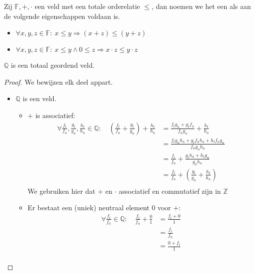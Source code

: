 \documentclass[main.tex]{subfiles}
\begin{document}
\begin{de}
  \label{de:totaal-geordend-veld}
  Zij $\mathbb{F},+,\cdot$ een veld met een totale orderelatie $\le$, dan noemen we het een  als aan de volgende eigenschappen voldaan is.
  \begin{itemize}
  \item $\forall x,y,z \in \mathbb{F}:\ x \le y \Rightarrow (x+z) \le (y+z)$
  \item $\forall x,y,z \in \mathbb{F}:\ x \le y \wedge 0 \le z \Rightarrow x\cdot z \le y\cdot z$
  \end{itemize}
\end{de}

\begin{pr}
  $\mathbb{Q}$ is een totaal geordend veld.

  \begin{proof}
    We bewijzen elk deel appart.
    \begin{itemize}
    \item $\mathbb{Q}$ is een veld.
      \begin{itemize}
      \item $+$ is associatief:
        \[ 
        \begin{array}{rrl}
          \forall \frac{f_{t}}{f_{n}},\frac{g_{t}}{g_{n}},\frac{h_{t}}{h_{n}} \in \mathbb{Q}:\
          &\left(\frac{f_{t}}{f_{n}} + \frac{g_{t}}{g_{n}}\right) + \frac{h_{t}}{h_{n}}
          &= \frac{f_{t}g_{n} + g_{t}f_{n}}{f_{n}g_{n}} + \frac{h_{t}}{h_{n}}\\
          &&= \frac{f_{t}g_{n}h_{n} + g_{t}f_{n}h_{n} + h_{t}f_{n}g_{n}}{f_{n}g_{n}h_{n}}\\
          &&=  \frac{f_{t}}{f_{n}} + \frac{g_{t}h_{n} + h_{t}g_{n}}{g_{n}h_{n}}\\
          &&= \frac{f_{t}}{f_{n}} + \left(\frac{g_{t}}{g_{n}} + \frac{h_{t}}{h_{n}}\right)\\
        \end{array}
        \]
        We gebruiken hier dat $+$ en $\cdot$ associatief en commutatief zijn in $\mathbb{Z}$
      \item Er bestaat een (uniek) neutraal element $0$ voor $+$:
        \[
        \begin{array}{rrl}
          \forall \frac{f_{t}}{f_{n}}\in \mathbb{Q}:\
          &\frac{f_{t}}{f_{n}} + \frac{0}{1}
          &= \frac{f_{t} + 0}{1}\\
          &&= \frac{f_{t}}{f_{n}}\\
          &&= \frac{0 + f_{t}}{1}\\

\end{array}\]
\end{itemize}
\end{itemize}
\end{proof}
\end{pr}
\end{document}
